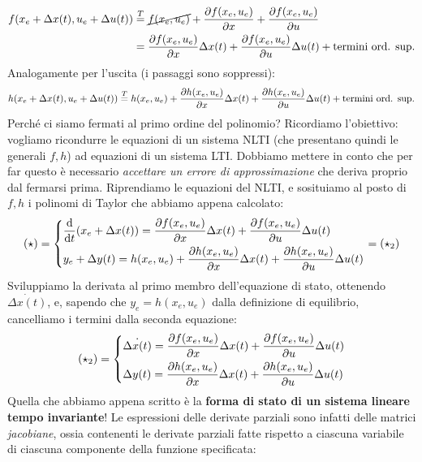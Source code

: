 \documentclass[a4paper]{report}
\begin{document}
\begin{align*}
	f(x_e + \Delta x(t), u_e + \Delta u(t)) & \stackrel{T}{=} \cancel{f(x_e, u_e)} + \pdv{f(x_e, u_e)}{x} (x_e + \Delta x(t) - x_e)+\pdv{f(x_e, u_e)}{u} (u_e + \Delta u(t) - u_e) \\ & =  \pdv{f(x_e, u_e)}{x} \Delta x(t)+\pdv{f(x_e, u_e)}{u} \Delta u(t) + \textrm{termini ord. sup.}
\end{align*}
Analogamente per l'uscita (i passaggi sono soppressi):
\begin{align*}
h(x_e + \Delta x(t), u_e + \Delta u(t)) \stackrel{T}{=} h(x_e, u_e)+\pdv{h(x_e, u_e)}{x} \Delta x(t)+\pdv{h(x_e, u_e)}{u} \Delta u(t) + \textrm{termini ord. sup.}
\end{align*}
Perché ci siamo fermati al primo ordine del polinomio? Ricordiamo l'obiettivo: vogliamo ricondurre le equazioni di un sistema NLTI (che presentano quindi le generali $f,h$) ad equazioni di un sistema LTI. Dobbiamo mettere in conto che per far questo è necessario \textit{accettare un errore di approssimazione} che deriva proprio dal fermarsi prima. Riprendiamo le equazioni del NLTI, e sosituiamo al posto di $f,h$ i polinomi di Taylor che abbiamo appena calcolato:
\begin{align*}
	(\star) = \begin{dcases}
	\dv{t}(x_e + \Delta x(t)) = \pdv{f(x_e, u_e)}{x} \Delta x(t)+\pdv{f(x_e, u_e)}{u} \Delta u(t) \\
	y_e + \Delta y(t) = h(x_e, u_e) + \pdv{h(x_e, u_e)}{x} \Delta x(t)+\pdv{h(x_e, u_e)}{u} \Delta u(t)
\end{dcases} = (\star_2)
\end{align*}
Sviluppiamo la derivata al primo membro dell'equazione di stato, ottenendo $\dot{\Delta x(t)}$, e, sapendo che $y_e = h(x_e, u_e)$ dalla definizione di equilibrio, cancelliamo i termini dalla seconda equazione:
\begin{align*}
	(\star_2) = \begin{dcases}
	\dot{\Delta x(t)} = \pdv{f(x_e, u_e)}{x} \Delta x(t)+\pdv{f(x_e, u_e)}{u} \Delta u(t) \\
	\Delta y(t) = \pdv{h(x_e, u_e)}{x} \Delta x(t)+\pdv{h(x_e, u_e)}{u} \Delta u(t)
\end{dcases} 
\end{align*}
Quella che abbiamo appena scritto è la \textbf{forma di stato di un sistema lineare tempo invariante}! Le espressioni delle derivate parziali sono infatti delle matrici \textit{jacobiane}, ossia contenenti le derivate parziali fatte rispetto a ciascuna variabile di ciascuna componente della funzione specificata:
\end{document}
